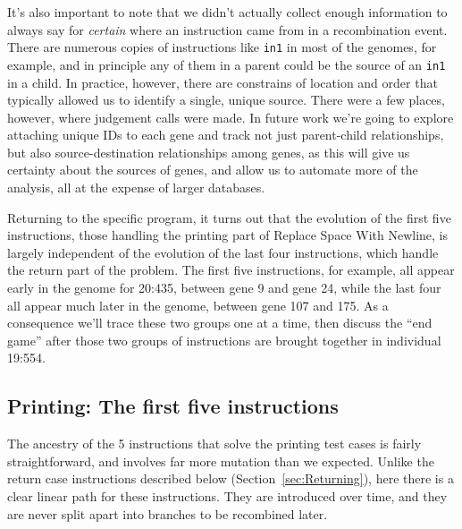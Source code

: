 \documentclass[graybox]{svmult}
\begin{document}
It's also important to note that we didn't actually collect enough information
to always say for \emph{certain} where an instruction came from in a 
recombination event. There are numerous copies of instructions like
\texttt{in1} in most of the genomes, for example, and in principle any of them
in a parent could be the source of an \texttt{in1} in a child. In practice,
however, there are constrains of location and order that typically allowed
us to identify a single, unique source. There were a few places, however, where
judgement calls were made. In future work we're going to explore attaching
unique IDs to each gene and track not just parent-child relationships, but
also source-destination relationships among genes, as this will give us
certainty about the sources of genes, and allow us to automate more of the
analysis, all at the expense of larger databases.

Returning to the specific program,
it turns
out that the evolution of the first five instructions, those handling the
printing part of Replace Space With Newline, is largely independent of
the evolution of the last four instructions, which handle the return part
of the problem. The first five instructions, for example, all appear early 
in the genome for 20:435, between gene 9 and gene 24, while the last four 
all appear much later in the genome, between gene 107 and 175. As a consequence
we'll trace these two groups one at a time, then discuss the ``end game'' after
those two groups of instructions are brought together in individual 19:554.

\subsection{Printing: The first five instructions}
\label{sec:Printing}

The ancestry of the 5 instructions that solve the printing test
cases is fairly straightforward, and involves far more mutation than we
expected. Unlike the return case instructions described below 
(Section~\ref{sec:Returning}), here there is a clear linear path for these 
instructions. They are introduced over time, and they 
are never split apart into branches to be recombined later.
\end{document}
